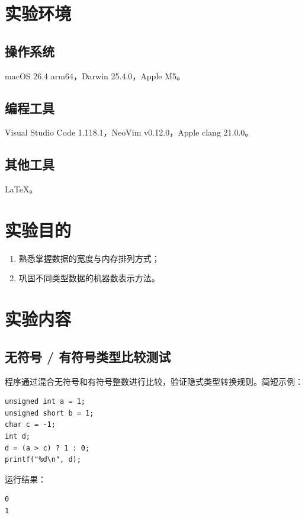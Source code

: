 \documentclass[12pt, a4paper]{academics}
\begin{document}
\makeacademicscover

\section{实验环境}

\subsection{操作系统}

macOS 26.4 arm64，Darwin 25.4.0，Apple M5。

\subsection{编程工具}

Visual Studio Code 1.118.1，NeoVim v0.12.0，Apple clang 21.0.0。

\subsection{其他工具}

\LaTeX{}。

\section{实验目的}

\begin{enumerate}
    \item 熟悉掌握数据的宽度与内存排列方式；
    \item 巩固不同类型数据的机器数表示方法。
\end{enumerate}

\section{实验内容}

\subsection{无符号 / 有符号类型比较测试}

程序通过混合无符号和有符号整数进行比较，验证隐式类型转换规则。简短示例：

\begin{verbatim}
unsigned int a = 1;
unsigned short b = 1;
char c = -1;
int d;
d = (a > c) ? 1 : 0;
printf("%d\n", d);
\end{verbatim}

运行结果：
\begin{verbatim}
0
1
\end{verbatim}
\end{document}

